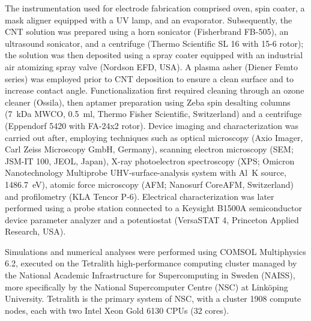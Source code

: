 The instrumentation used for electrode fabrication comprised oven, spin coater, a mask aligner equipped with a UV lamp, and an evaporator. 
Subsequently, the CNT solution was prepared using a horn sonicator (Fisherbrand FB-505), an ultrasound sonicator, and a centrifuge (Thermo Scientific SL 16 with 15-6 rotor); the solution was then deposited using a spray coater equipped with an industrial air atomizing spray valve (Nordson EFD, USA). A plasma asher (Diener Femto series) was employed prior to CNT deposition to ensure a clean surface and to increase contact angle.
Functionalization first required cleaning through an ozone cleaner (Ossila), then aptamer preparation using Zeba spin desalting columns (\SI{7}{\kilo\dalton} MWCO, \SI{0.5}{\ml}, Thermo Fisher Scientific, Switzerland) and a centrifuge (Eppendorf 5420 with FA-24x2 rotor).
Device imaging and characterization was carried out after, employing techniques such as optical microscopy (Axio Imager, Carl Zeiss Microscopy GmbH, Germany), scanning electron microscopy (SEM; JSM-IT 100, JEOL, Japan), X-ray photoelectron spectroscopy (XPS; Omicron Nanotechnology Multiprobe UHV-surface-analysis system with Al~K\textalpha{} source, \SI{1486.7}{\electronvolt}), atomic force microscopy (AFM; Nanosurf CoreAFM, Switzerland) and profilometry (KLA Tencor P-6). Electrical characterization was later performed using a probe station connected to a Keysight B1500A semiconductor device parameter analyzer and a potentiostat (VersaSTAT 4, Princeton Applied Research, USA).

Simulations and numerical analyses were performed using COMSOL Multiphysics 6.2, executed on the Tetralith high-performance computing cluster managed by the National Academic Infrastructure for Supercomputing in Sweden (NAISS), more specifically by the National Supercomputer Centre (NSC)
at Linköping University. Tetralith is the primary system of NSC, with a cluster \num{1908} compute nodes, each with two Intel Xeon Gold 6130 CPUs (32 cores).


